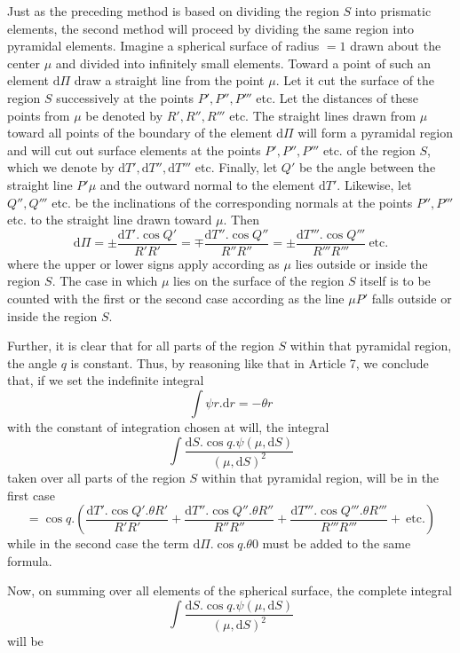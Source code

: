 Just as the preceding method is based on dividing the region $S$ into prismatic elements, the second method will proceed by dividing the same region into pyramidal elements. Imagine a spherical surface of radius $=1$ drawn about the center $\mu$ and divided into infinitely small elements. Toward a point of such an element $\mathrm{d}\Pi$ draw a straight line from the point $\mu$. Let it cut the surface of the region $S$ successively at the points $P',P'',P'''$ etc. Let the distances of these points from $\mu$ be denoted by $R',R'',R'''$ etc. The straight lines drawn from $\mu$ toward all points of the boundary of the element $\mathrm{d}\Pi$ will form a pyramidal region and will cut out surface elements at the points $P',P'',P'''$ etc. of the region $S$, which we denote by $\mathrm{d}T',\mathrm{d}T'',\mathrm{d}T'''$ etc. Finally, let $Q'$ be the angle between the straight line $P'\mu$ and the outward normal to the element $\mathrm{d}T'$. Likewise, let $Q'',Q'''$ etc. be the inclinations of the corresponding normals at the points $P'',P'''$ etc. to the straight line drawn toward $\mu$. Then
\[
\mathrm{d}\Pi=\pm\frac{\mathrm{d}T'.\cos Q'}{R'R'}=\mp\frac{\mathrm{d}T''.\cos Q''}{R''R''}=\pm\frac{\mathrm{d}T'''.\cos Q'''}{R'''R'''}\ \text{etc.}
\]
where the upper or lower signs apply according as $\mu$ lies outside or inside the region $S$. The case in which $\mu$ lies on the surface of the region $S$ itself is to be counted with the first or the second case according as the line $\mu P'$ falls outside or inside the region $S$.

Further, it is clear that for all parts of the region $S$ within that pyramidal region, the angle $q$ is constant. Thus, by reasoning like that in Article 7, we conclude that, if we set the indefinite integral
\[
\int\psi r.\mathrm{d}r=-\theta r
\]
with the constant of integration chosen at will, the integral
\[
\int\frac{\mathrm{d}S.\cos q.\psi(\mu,\mathrm{d}S)}{(\mu,\mathrm{d}S)^2}
\]
taken over all parts of the region $S$ within that pyramidal region, will be in the first case
\[
=\cos q.\left(\frac{\mathrm{d}T'.\cos Q'.\theta R'}{R'R'}+\frac{\mathrm{d}T''.\cos Q''.\theta R''}{R''R''}+\frac{\mathrm{d}T'''.\cos Q'''.\theta R'''}{R'''R'''}+\ \text{etc.}\right)
\]
while in the second case the term $\mathrm{d}\Pi.\cos q.\theta0$ must be added to the same formula.

Now, on summing over all elements of the spherical surface, the complete integral
\[
\int\frac{\mathrm{d}S.\cos q.\psi(\mu,\mathrm{d}S)}{(\mu,\mathrm{d}S)^2}
\]
will be


